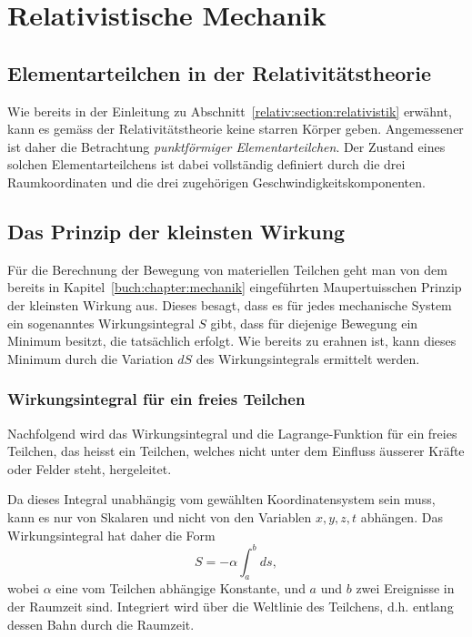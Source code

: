 
\section{Relativistische Mechanik
\label{relativ:section:rel-mech}}

\subsection{Elementarteilchen in der Relativitätstheorie
\label{relativ:section:elementarteilchen}}

Wie bereits in der Einleitung zu Abschnitt~\ref{relativ:section:relativistik} erwähnt,
kann es gemäss der Relativitätstheorie keine starren Körper geben.
Angemessener ist daher die Betrachtung \emph{punktförmiger Elementarteilchen}.
Der Zustand eines solchen Elementarteilchens ist dabei vollständig definiert durch
die drei Raumkoordinaten und die drei zugehörigen Geschwindigkeitskomponenten.


\subsection{Das Prinzip der kleinsten Wirkung
\label{relativ:section:kleinste-wirkung}}

Für die Berechnung der Bewegung von materiellen Teilchen geht man
von dem bereits in Kapitel~\ref{buch:chapter:mechanik} eingeführten
Maupertuisschen Prinzip der kleinsten Wirkung aus.
Dieses besagt, dass es für jedes mechanische System ein sogenanntes
Wirkungsintegral \(S\) gibt,
dass für diejenige Bewegung ein Minimum besitzt, die tatsächlich erfolgt.
Wie bereits zu erahnen ist, kann dieses Minimum durch die Variation \(dS\)
des Wirkungsintegrals ermittelt werden.

\subsubsection{Wirkungsintegral für ein freies Teilchen
\label{relativ:section:wirk-int-freies-teilchen}}

Nachfolgend wird das Wirkungsintegral und die Lagrange-Funktion
für ein freies Teilchen, das heisst ein Teilchen, welches nicht
unter dem Einfluss äusserer Kräfte oder Felder steht, hergeleitet.

Da dieses Integral unabhängig vom gewählten Koordinatensystem sein muss,
kann es nur von Skalaren und nicht von den Variablen \(x, y, z, t\) abhängen.
Das Wirkungsintegral hat daher die Form
\begin{equation}
    S = - \alpha \int_{a}^{b} ds,
\label{relativ:eqn:wirk-int-grundform}
\end{equation}
wobei \(\alpha\) eine vom Teilchen abhängige Konstante,
und \(a\) und \(b\) zwei Ereignisse in der Raumzeit sind.
Integriert wird über die Weltlinie des Teilchens,
d.h. entlang dessen Bahn durch die Raumzeit.

